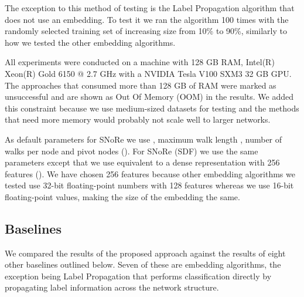 \documentclass[twoside,11pt]{article}
\begin{document}
The exception to this method of testing is the Label Propagation algorithm that does not use an embedding. To test it we ran the algorithm 100 times with the randomly selected training set of increasing size from 10\% to 90\%, similarly to how we tested the other embedding algorithms.

All experiments were conducted on a machine with 128 GB RAM, Intel(R) Xeon(R) Gold 6150 @ 2.7 GHz with a NVIDIA Tesla V100 SXM3 32 GB GPU. The approaches that consumed more than 128 GB of RAM were marked as unsuccessful and are shown as Out Of Memory (OOM) in the results. We added this constraint because we use medium-sized datasets for testing and the methods that need more memory would probably not scale well to larger networks.

As default parameters for SNoRe we use , maximum walk length , number of walks per node  and  pivot nodes (). For SNoRe (SDF) we use the same parameters except that we use  equivalent to a dense representation with 256 features (). We have chosen 256 features because other embedding algorithms we tested use 32-bit floating-point numbers with 128 features whereas we use 16-bit floating-point values, making the size of the embedding the same.

\subsection{Baselines}
We compared the results of the proposed approach against the results of eight other baselines outlined below. Seven of these are embedding algorithms, the exception being Label Propagation that performs classification directly by propagating label information across the network structure.
\end{document}
